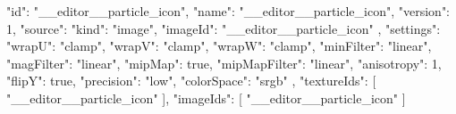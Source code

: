 {
  "id": "__editor__particle_icon",
  "name": "__editor__particle_icon",
  "version": 1,
  "source": {
    "kind": "image",
    "imageId": "__editor__particle_icon"
  },
  "settings": {
    "wrapU": "clamp",
    "wrapV": "clamp",
    "wrapW": "clamp",
    "minFilter": "linear",
    "magFilter": "linear",
    "mipMap": true,
    "mipMapFilter": "linear",
    "anisotropy": 1,
    "flipY": true,
    "precision": "low",
    "colorSpace": "srgb"
  },
  "textureIds": [
    "__editor__particle_icon"
  ],
  "imageIds": [
    "__editor__particle_icon"
  ]
}
